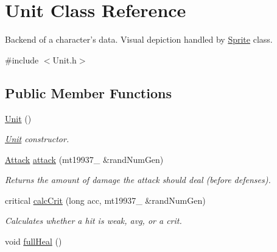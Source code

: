 \hypertarget{class_unit}{}\section{Unit Class Reference}
\label{class_unit}


Backend of a character’s data. Visual depiction handled by \hyperlink{class_sprite}{Sprite} class.  




{\ttfamily \#include $<$Unit.\+h$>$}

\subsection*{Public Member Functions}
\begin{DoxyCompactItemize}
\item 
\hyperlink{class_unit_a8e46f663a95736c8002d85ab271a7581}{Unit} ()\hypertarget{class_unit_a8e46f663a95736c8002d85ab271a7581}{}\label{class_unit_a8e46f663a95736c8002d85ab271a7581}

\begin{DoxyCompactList}\small\item\em \hyperlink{class_unit}{Unit} constructor. \end{DoxyCompactList}\item 
\hyperlink{class_attack}{Attack} \hyperlink{class_unit_af09235c061e2a98ab6fd74f99ecddc90}{attack} (mt19937\+\_ \&rand\+Num\+Gen)\hypertarget{class_unit_af09235c061e2a98ab6fd74f99ecddc90}{}\label{class_unit_af09235c061e2a98ab6fd74f99ecddc90}

\begin{DoxyCompactList}\small\item\em Returns the amount of damage the attack should deal (before defenses). \end{DoxyCompactList}\item 
critical \hyperlink{class_unit_ae6bd745065885b5c3d46a2b7781571a4}{calc\+Crit} (long acc, mt19937\+\_ \&rand\+Num\+Gen)\hypertarget{class_unit_ae6bd745065885b5c3d46a2b7781571a4}{}\label{class_unit_ae6bd745065885b5c3d46a2b7781571a4}

\begin{DoxyCompactList}\small\item\em Calculates whether a hit is weak, avg, or a crit. \end{DoxyCompactList}\item 
void \hyperlink{class_unit_a2a7293b325fbe8e73fece385b2a0970f}{full\+Heal} ()\hypertarget{class_unit_a2a7293b325fbe8e73fece385b2a0970f}{}\label{class_unit_a2a7293b325fbe8e73fece385b2a0970f}


\end{DoxyCompactItemize}

